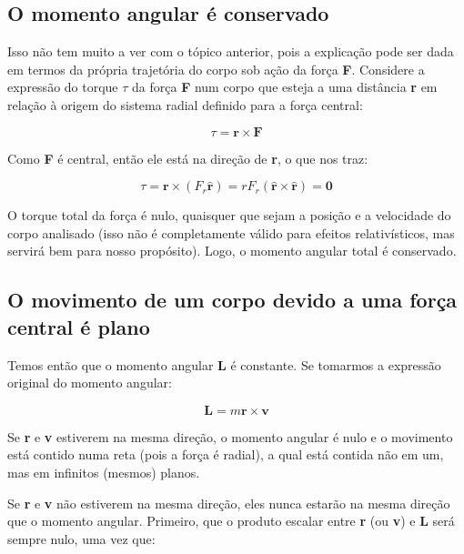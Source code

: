 \subsection{O momento angular é conservado}

Isso não tem muito a ver com o tópico anterior, pois a explicação pode ser dada em termos da própria trajetória do corpo sob ação da força \textbf{F}. Considere a expressão do torque $\tau$ da força \textbf{F} num corpo que esteja a uma distância \textbf{r} em relação à origem do sistema radial definido para a força central:

\begin{equation}
	\tau = \mathbf{r} \times \mathbf{F} \label{eq19}
\end{equation}

Como \textbf{F} é central, então ele está na direção de \textbf{r}, o que nos traz:

\begin{equation}
	\tau = \mathbf{r} \times (F_r\mathbf{\hat{r}}) = rF_r(\mathbf{\hat{r}} \times \mathbf{\hat{r}}) = \mathbf{0} 
	\label{eq20}
\end{equation}

O torque total da força é nulo, quaisquer que sejam a posição e a velocidade do corpo analisado (isso não é completamente válido para efeitos relativísticos, mas servirá bem para nosso propósito). Logo, o momento angular total é conservado.

\subsection{O movimento de um corpo devido a uma força central é plano}

Temos então que o momento angular \textbf{L} é constante. Se tomarmos a expressão original do momento angular:

\begin{equation}
	\mathbf{L} = m\mathbf{r} \times \mathbf{v} \label{eq21}
\end{equation}

Se \textbf{r} e \textbf{v} estiverem na mesma direção, o momento angular é nulo e o movimento está contido numa reta (pois a força é radial), a qual está contida não em um, mas em infinitos (mesmos) planos.

Se \textbf{r} e \textbf{v} não estiverem na mesma direção, eles nunca estarão na mesma direção que o momento angular. Primeiro, que o produto escalar entre \textbf{r} (ou \textbf{v}) e \textbf{L} será sempre nulo, uma vez que:


